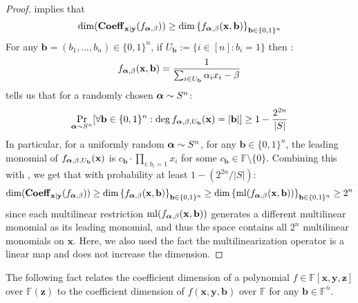 \documentclass[11pt]{article}
\newcommand{\Boo}{\{0,1 \}}
\newcommand{\F}{\mathbb{F}}
\begin{document}
\begin{proof}
     implies that $$\dim (\bfCoeff_{\mathbf{x}|\mathbf{y}}(f_{\bfalpha,\beta})) \geq \dim \left\{ f_{\bfalpha,\beta}(\mathbf{x},\mathbf{b}) \right\}_{\mathbf{b}\in \Boo^n}$$
    For any $\mathbf{b}=(b_1, \dots, b_n) \in \Boo^n$, if $U_{\mathbf{b}}:= \{i\in[n]: b_i = 1\}$ then : $$f_{\boldsymbol{\alpha},\beta}(\mathbf{x},\mathbf{b}) = \frac{1}{\sum_{i\in U_{\mathbf{b}}} \alpha_i x_i - \beta}$$
     tells us that for a randomly chosen $\boldsymbol{\alpha} \sim S^n$: $$\Pr_{\bfalpha \sim S^n}[\forall \mathbf{b}\in\Boo^n:\deg{f_{\bfalpha,\beta,U_{\mathbf{b}}}(\mathbf{x})} = |\mathbf{b}|] \geq 1 -\frac{2^{2n}}{|S|}$$
    In particular, for a uniformly random $\boldsymbol{\alpha}\sim S^n$, for any $\mathbf{b}\in \Boo^n$, the leading monomial of $f_{\boldsymbol{\alpha},\beta,U_{\mathbf{b}}}(\mathbf{x})$ is $c_\mathbf{b}\cdot \prod_{i:b_i = 1}x_i$ for some $c_\mathbf{b} \in \F\setminus\{0\}$. Combining this with , we get that with probability at least $1 - (2^{2n}/|S|)$: $$\dim (\bfCoeff_{\mathbf{x}|\mathbf{y}}(f_{\bfalpha,\beta}))\geq \dim \left\{ f_{\bfalpha,\beta}(\mathbf{x},\mathbf{b}) \right\}_{\mathbf{b}\in \Boo^n}\geq \dim \left\{ \operatorname{ml}(f_{\bfalpha,\beta}(\mathbf{x},\mathbf{b})) \right\}_{\mathbf{b}\in \Boo^n} \geq 2^n$$
    since each multilinear restriction $\operatorname{ml}(f_{\boldsymbol{\alpha},\beta}(\mathbf{x},\mathbf{b}))$ generates a different multilinear monomial as its leading monomial, and thus the space contains all $2^n$ multilinear monomials on $\mathbf{x}$. Here, we also used the fact the multilinearization operator is a linear map and does not increase the dimension.
\end{proof}



The following fact relates the coefficient dimension of a polynomial $f\in \F[\mathbf{x},\mathbf{y},\mathbf{z}]$ over $\F(\mathbf{z})$ to the coefficient dimension of $f(\mathbf{x},\mathbf{y},\mathbf{b})$ over $\F$ for any $\mathbf{b} \in \F^n$.  
\end{document}
